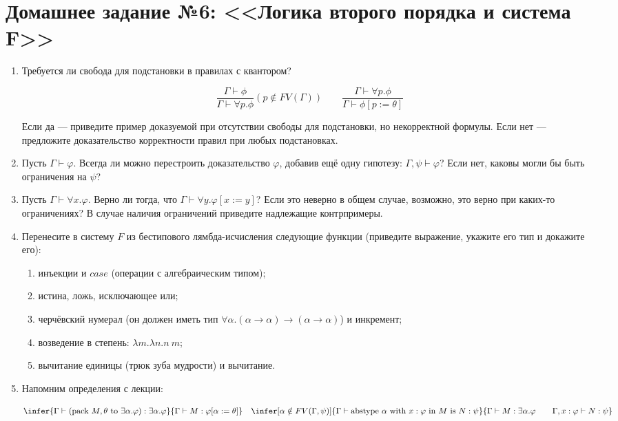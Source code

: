 \documentclass[10pt,a4paper,oneside]{article}
\begin{document}
\section*{Домашнее задание №6: <<Логика второго порядка и система F>>}
\begin{enumerate}
\item Требуется ли свобода для подстановки в правилах с квантором?

    \[ \dfrac{\Gamma\vdash\phi}{\Gamma\vdash\forall p.\phi} (p\notin FV(\Gamma)) \qquad
        \dfrac{\Gamma\vdash\forall p.\phi}{\Gamma\vdash\phi[p:=\theta]} \]

Если да --- приведите пример доказуемой при отсутствии свободы для подстановки, но некорректной формулы. 
Если нет --- предложите доказательство корректности правил при любых подстановках.

\item Пусть $\Gamma\vdash\varphi$. Всегда ли можно перестроить доказательство $\varphi$, добавив ещё одну гипотезу:
$\Gamma,\psi\vdash\varphi$? Если нет, каковы могли бы быть ограничения на $\psi$?

\item Пусть $\Gamma\vdash\forall x.\varphi$. Верно ли тогда, что $\Gamma\vdash\forall y.\varphi[x := y]$? 
Если это неверно в общем случае, возможно, это верно при каких-то ограничениях? В случае наличия ограничений
приведите надлежащие контрпримеры.

\item Перенесите в систему $F$ из бестипового лямбда-исчисления следующие функции (приведите выражение, укажите его тип и докажите его):
\begin{enumerate}
\item инъекции и $case$ (операции с алгебраическим типом);
\item истина, ложь, исключающее или;
\item черчёвский нумерал (он должен иметь тип $\forall\alpha.(\alpha\rightarrow\alpha)\rightarrow(\alpha\rightarrow\alpha)$) и инкремент;
\item возведение в степень: $\lambda m.\lambda n.n\ m$;
\item вычитание единицы (трюк зуба мудрости) и вычитание.
\end{enumerate}

\item Напомним определения с лекции:

 	$$\infer{\Gamma\vdash (\text{pack } M, \theta \text{ to } \exists \alpha . \varphi) : \exists \alpha.\varphi}{\Gamma \vdash M : \varphi[\alpha := \theta]}
 	 \quad\infer[\alpha \notin FV(\Gamma, \psi)]{\Gamma \vdash \text{abstype } \alpha \text{ with } x:\varphi \text{ in } M \text{ is } N:\psi}{\Gamma \vdash M : \exists \alpha . \varphi\qquad\Gamma, x : \varphi \vdash N : \psi}
	$$


\end{enumerate}
\end{document}
